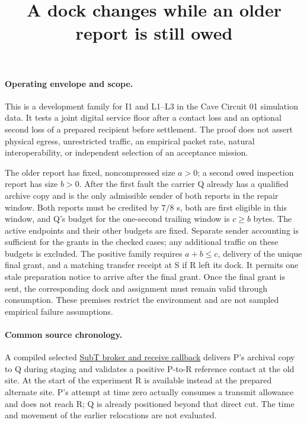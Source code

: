 \documentclass{article}
\title{A dock changes while an older report is still owed}
\author{}
\date{}
\begin{document}
\maketitle
\paragraph{Operating envelope and scope.}
This is a development family for I1 and L1--L3 in the Cave Circuit 01
simulation data. It tests a joint digital service floor after a
contact loss and an optional second loss of a prepared recipient
before settlement. The proof does not assert physical egress,
unrestricted traffic, an empirical packet rate, natural interoperability,
or independent selection of an acceptance mission.

The older report has fixed, noncompressed size \(a>0\); a second owed
inspection report has size \(b>0\). After the first fault the carrier Q
already has a qualified archive copy and is the only admissible
sender of both reports in the repair window. Both reports must
be credited by \(7/8\) s, both are first eligible in this window,
and Q's budget for the one-second trailing window is \(c\ge b\) bytes.
The active endpoints and their other budgets are fixed.
Separate sender accounting is sufficient for the grants in the
checked cases; any additional traffic on these budgets is excluded.
The positive family requires \(a+b\le c\), delivery of the unique
final grant, and a matching transfer receipt at S if R left its
dock. It permits one stale preparation notice to arrive after the
final grant. Once the final grant is sent, the corresponding
dock and assignment must remain valid through consumption.
These premises restrict the environment and are not sampled
empirical failure assumptions.

\paragraph{Common source chronology.}
A compiled selected
\href{https://github.com/osrf/subt/tree/083c6a8acb0c25aa1a35e34517e628cd3b52ae77}{SubT broker and receive callback}
delivers P's archival copy to Q during staging and validates a
positive P-to-R reference contact at the old site. At the start of
the experiment R is available instead at the prepared alternate site.
P's attempt at time zero actually consumes a transmit allowance
and does not reach R; Q is already positioned beyond that
direct cut. The time and movement of the earlier relocations
are not evaluated.
\end{document}
